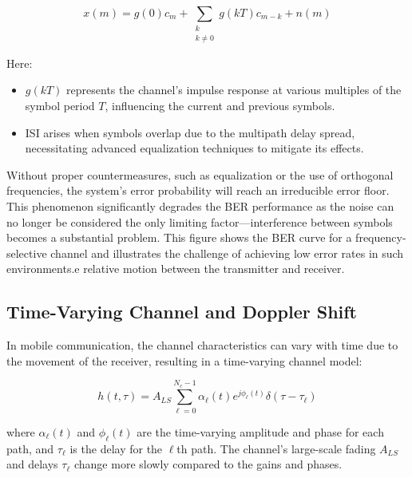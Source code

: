 \begin{equation}
    x(m) = g(0)c_m + \sum_{\substack{k \\ k \neq 0}} g(kT)c_{m-k} + n(m)
\end{equation}

Here:
\begin{itemize}
    \item \( g(kT) \) represents the channel's impulse response at various multiples of the symbol period \( T \), influencing the current and previous symbols.
    \item ISI arises when symbols overlap due to the multipath delay spread, necessitating advanced equalization techniques to mitigate its effects.
\end{itemize}

Without proper countermeasures, such as equalization or the use of orthogonal frequencies, the system's error probability will reach an irreducible error floor. This phenomenon significantly degrades the BER performance as the noise can no longer be considered the only limiting factor—interference between symbols becomes a substantial problem.
This figure shows the BER curve for a frequency-selective channel and illustrates the challenge of achieving low error rates in such environments.e relative motion between the transmitter and receiver.











\subsection*{Time-Varying Channel and Doppler Shift}

In mobile communication, the channel characteristics can vary with time due to the movement of the receiver, resulting in a time-varying channel model:

\begin{equation}
    h(t, \tau) = A_{LS} \sum_{\ell=0}^{N_c-1} \alpha_{\ell}(t) e^{j\phi_{\ell}(t)} \delta(\tau - \tau_{\ell})
\end{equation}

where \( \alpha_{\ell}(t) \) and \( \phi_{\ell}(t) \) are the time-varying amplitude and phase for each path, and \( \tau_{\ell} \) is the delay for the \(\ell\)th path. The channel's large-scale fading \( A_{LS} \) and delays \( \tau_{\ell} \) change more slowly compared to the gains and phases.

